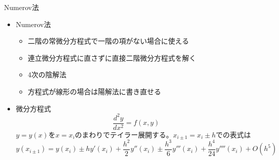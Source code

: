 \begin{frame}[t,fragile]{Numerov法}
  \begin{itemize}
  \item Numerov法
    \begin{itemize}
    \item 二階の常微分方程式で一階の項がない場合に使える
    \item 連立微分方程式に直さずに直接二階微分方程式を解く
    \item 4次の陰解法
    \item 方程式が線形の場合は陽解法に書き直せる
    \end{itemize}
  \item 微分方程式
    \[
    \frac{d^2y}{dx^2} = f(x,y)
    \]
  $y=y(x)$を$x=x_i$のまわりでテイラー展開する。$x_{i \pm 1} = x_i \pm h$での表式は
      \[
      y(x_{i \pm 1}) = y(x_i) \pm h y'(x_i) + \frac{h^2}{2} y''(x_i) \pm \frac{h^3}{6} y'''(x_i) + \frac{h^4}{24} y''''(x_i)  + O(h^5)
      \]
  \end{itemize}
\end{frame}
